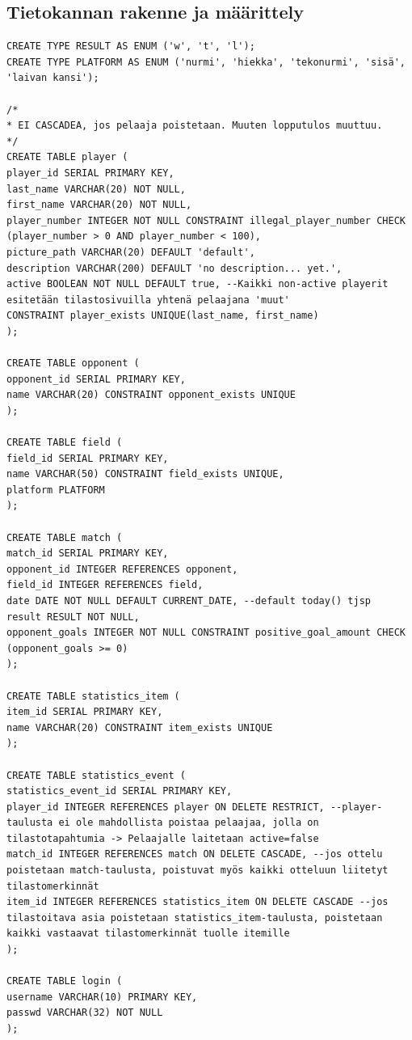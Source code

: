 \documentclass[12pt]{article} %
\begin{document}
\subsection{Tietokannan rakenne ja määrittely} %
\lstset{frame=single, language=SQL, caption=Create Table Statements, basicstyle=\footnotesize, breaklines=true,}
\begin{lstlisting}
CREATE TYPE RESULT AS ENUM ('w', 't', 'l');
CREATE TYPE PLATFORM AS ENUM ('nurmi', 'hiekka', 'tekonurmi', 'sisä', 'laivan kansi');

/*
* EI CASCADEA, jos pelaaja poistetaan. Muuten lopputulos muuttuu.
*/
CREATE TABLE player (
player_id SERIAL PRIMARY KEY,
last_name VARCHAR(20) NOT NULL,
first_name VARCHAR(20) NOT NULL,
player_number INTEGER NOT NULL CONSTRAINT illegal_player_number CHECK (player_number > 0 AND player_number < 100),
picture_path VARCHAR(20) DEFAULT 'default',
description VARCHAR(200) DEFAULT 'no description... yet.',
active BOOLEAN NOT NULL DEFAULT true, --Kaikki non-active playerit esitetään tilastosivuilla yhtenä pelaajana 'muut'
CONSTRAINT player_exists UNIQUE(last_name, first_name)
);

CREATE TABLE opponent (
opponent_id SERIAL PRIMARY KEY,
name VARCHAR(20) CONSTRAINT opponent_exists UNIQUE
);

CREATE TABLE field (
field_id SERIAL PRIMARY KEY,
name VARCHAR(50) CONSTRAINT field_exists UNIQUE,
platform PLATFORM
);

CREATE TABLE match (
match_id SERIAL PRIMARY KEY,
opponent_id INTEGER REFERENCES opponent,
field_id INTEGER REFERENCES field,
date DATE NOT NULL DEFAULT CURRENT_DATE, --default today() tjsp
result RESULT NOT NULL,
opponent_goals INTEGER NOT NULL CONSTRAINT positive_goal_amount CHECK (opponent_goals >= 0)
);

CREATE TABLE statistics_item (
item_id SERIAL PRIMARY KEY,
name VARCHAR(20) CONSTRAINT item_exists UNIQUE
);

CREATE TABLE statistics_event (
statistics_event_id SERIAL PRIMARY KEY,
player_id INTEGER REFERENCES player ON DELETE RESTRICT, --player-taulusta ei ole mahdollista poistaa pelaajaa, jolla on tilastotapahtumia -> Pelaajalle laitetaan active=false
match_id INTEGER REFERENCES match ON DELETE CASCADE, --jos ottelu poistetaan match-taulusta, poistuvat myös kaikki otteluun liitetyt tilastomerkinnät
item_id INTEGER REFERENCES statistics_item ON DELETE CASCADE --jos tilastoitava asia poistetaan statistics_item-taulusta, poistetaan kaikki vastaavat tilastomerkinnät tuolle itemille
);

CREATE TABLE login (
username VARCHAR(10) PRIMARY KEY,
passwd VARCHAR(32) NOT NULL
);

\end{lstlisting}
\end{document}
